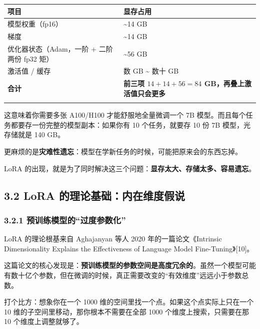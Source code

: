 \documentclass[
  chinese,
]{ctexart}
\begin{document}
\begin{center}
\begin{tabular}{@{}>{\raggedright\arraybackslash}p{} >{\raggedright\arraybackslash}p{}@{}}
\toprule\noalign{}
项目 & 显存占用 \\
\midrule\noalign{}
模型权重（fp16） & \textasciitilde14 GB \\
梯度 & \textasciitilde14 GB \\
优化器状态（Adam，一阶 + 二阶两份 fp32 矩） & \textasciitilde56 GB \\
激活值 / 缓存 & 数 GB \textasciitilde{} 数十 GB \\
\textbf{合计} & \textbf{前三项 \(14+14+56 = 84\) GB，再叠上激活值只会更多} \\
\bottomrule\noalign{}
\end{tabular}
\end{center}

这意味着你需要多张 A100/H100 才能舒服地全量微调一个 7B
模型。而且每个任务都要存一份完整的模型副本：如果你有 10 个任务，就要存
10 份 7B 模型，光存储就是 140 GB。

更麻烦的是\textbf{灾难性遗忘}：模型在学新任务的时候，可能把原来会的东西忘掉。

LoRA
的出现，就是为了同时解决这三个问题：\textbf{显存太大、存储太多、容易遗忘}。

\subsection{3.2 LoRA
的理论基础：内在维度假说}\label{lora-ux7684ux7406ux8bbaux57faux7840ux5185ux5728ux7ef4ux5ea6ux5047ux8bf4}

\subsubsection{3.2.1
预训练模型的``过度参数化''}\label{ux9884ux8badux7ec3ux6a21ux578bux7684ux8fc7ux5ea6ux53c2ux6570ux5316}

LoRA 的理论根基来自 Aghajanyan 等人 2020 年的一篇论文《Intrinsic
Dimensionality Explains the Effectiveness of Language Model
Fine-Tuning》{[}10{]}。

这篇论文的核心发现是：\textbf{预训练模型的参数空间是高度冗余的}。虽然一个模型可能有数十亿个参数，但在微调的时候，真正需要改变的``有效维度''远远小于参数总数。

打个比方：想象你在一个 1000 维的空间里找一个点。如果这个点实际上只在一个
10 维的子空间里移动，那你根本不需要在全部 1000 个维度上搜索，只需要在那
10 个维度上调整就够了。
\end{document}
